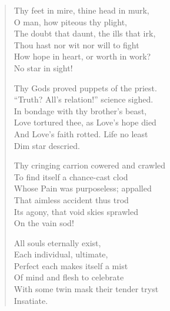 
\begin{verse}
  Thy feet in mire, thine head in murk, \\
  \hspace{1em} O man, how piteous thy plight, \\
  The doubt that daunt, the ills that irk, \\
  \hspace{1em} Thou  hast nor wit nor will to fight \textemdash{} \\
  How hope in heart, or worth in work? \\
  \hspace{1em} No star in sight!

  Thy Gods proved puppets of the priest. \\
  \hspace{1em} \enquote{Truth? All's relation!} science sighed. \\
  In bondage with thy brother's beast, \\
  \hspace{1em} Love tortured thee, as Love's hope died \\
  And Love's faith rotted. Life no least \\
  \hspace{1em} Dim star descried.

  Thy cringing carrion cowered and crawled \\
  \hspace{1em}To find itself a chance-cast clod \\
  Whose Pain was purposeless; appalled \\
  \hspace{1em}That aimless accident thus trod \\
  Its agony, that void skies sprawled \\
  \hspace{1em}On the vain sod!

  All souls eternally exist, \\
  \hspace{1em}Each individual, ultimate, \\
  Perfect \textemdash{} each makes itself a mist \\
  \hspace{1em}Of mind and flesh to celebrate \\
  With some twin mask their tender tryst \\
  \hspace{1em}Insatiate.


\end{verse}
